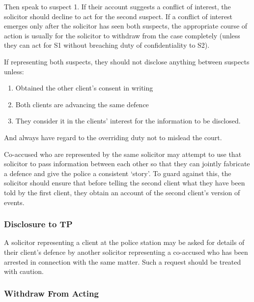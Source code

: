 \documentclass[
]{article}
\newenvironment{Shaded}{}{}
\newcommand{\NormalTok}[1]{#1}
\providecommand{\tightlist}{%
  \setlength{\itemsep}{0pt}\setlength{\parskip}{0pt}}
\begin{document}
Then speak to suspect 1. If their account suggests a conflict of
interest, the solicitor should decline to act for the second suspect. If
a conflict of interest emerges only after the solicitor has seen both
suspects, the appropriate course of action is usually for the solicitor
to withdraw from the case completely (unless they can act for S1 without
breaching duty of confidentiality to S2).

If representing both suspects, they should not disclose anything between
suspects unless:

\begin{enumerate}
\def\labelenumi{\arabic{enumi}.}
\tightlist
\item
  Obtained the other client's consent in writing
\item
  Both clients are advancing the same defence
\item
  They consider it in the clients' interest for the information to be
  disclosed.
\end{enumerate}

And always have regard to the overriding duty not to mislead the court.

\begin{Shaded}
\begin{Highlighting}[]
\NormalTok{Co{-}accused who are represented by the same solicitor may attempt to use that solicitor to pass information between each other so that they can jointly fabricate a defence and give the police a consistent ‘story’. To guard against this, the solicitor should ensure that before telling the second client what they have been told by the first client, they obtain an account of the second client’s version of events.}
\end{Highlighting}
\end{Shaded}

\hypertarget{disclosure-to-tp}{%
\subsubsection{Disclosure to TP}\label{disclosure-to-tp}}

A solicitor representing a client at the police station may be asked for
details of their client's defence by another solicitor representing a
co-accused who has been arrested in connection with the same matter.
Such a request should be treated with caution.

\hypertarget{withdraw-from-acting}{%
\subsubsection{Withdraw From Acting}\label{withdraw-from-acting}}
\end{document}
